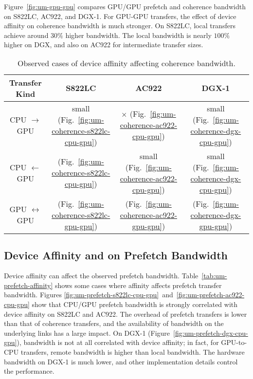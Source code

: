 Figure~\ref{fig:um-gpu-gpu} compares GPU/GPU prefetch and coherence bandwidth on S822LC, AC922, and DGX-1.
For GPU-GPU transfers, the effect of device affinity on coherence bandwidth is much stronger.
On S822LC, local transfers achieve around $30\%$ higher bandwidth.
The local bandwidth is nearly $100\%$ higher on DGX, and also on AC922 for intermediate transfer sizes.

\begin{table}[ht]
	\centering
	\caption[Device affinity and coherence bandwidth]{
		Observed cases of device affinity affecting coherence bandwidth.
	}
	\label{tab:um-coherence-affinity}
	\begin{tabular}{cccc}
		\hline
		\textbf{Transfer Kind}    & \textbf{S822LC}                                         & \textbf{AC922}                                         & \textbf{DGX-1}                                      \\ \hline 
		CPU $\rightarrow$     GPU & small (Fig.~\ref{fig:um-coherence-s822lc-cpu-gpu})      & $\times$   (Fig.~\ref{fig:um-coherence-ac922-cpu-gpu}) & small (Fig.~\ref{fig:um-coherence-dgx-cpu-gpu}) \\ \hline
		CPU $\leftarrow$      GPU & \checkmark (Fig.~\ref{fig:um-coherence-s822lc-cpu-gpu}) & small (Fig.~\ref{fig:um-coherence-ac922-cpu-gpu})      & small (Fig.~\ref{fig:um-coherence-dgx-cpu-gpu}) \\ \hline
		GPU $\leftrightarrow$ GPU & \checkmark (Fig.~\ref{fig:um-coherence-s822lc-gpu-gpu}) & \checkmark (Fig.~\ref{fig:um-coherence-ac922-gpu-gpu}) & \checkmark (Fig.~\ref{fig:um-coherence-dgx-gpu-gpu}) \\ \hline
	\end{tabular}
\end{table}


\subsection{Device Affinity and on Prefetch Bandwidth}

Device affinity can affect the observed prefetch bandwidth.
Table~\ref{tab:um-prefetch-affinity} shows some cases where affinity affects prefetch transfer bandwidth.
Figures \ref{fig:um-prefetch-s822lc-cpu-gpu}~and~\ref{fig:um-prefetch-ac922-cpu-gpu} show that CPU/GPU prefetch bandwidth is strongly correlated with device affinity on S822LC and AC922.
The overhead of prefetch transfers is lower than that of coherence transfers, and the availability of bandwidth on the underlying links has a large impact.
On DGX-1 (Figure~\ref{fig:um-prefetch-dgx-cpu-gpu}), bandwidth is not at all correlated with device affinity; in fact, for GPU-to-CPU transfers, remote bandwidth is higher than local bandwidth.
The hardware bandwidth on DGX-1 is much lower, and other implementation details control the performance.


